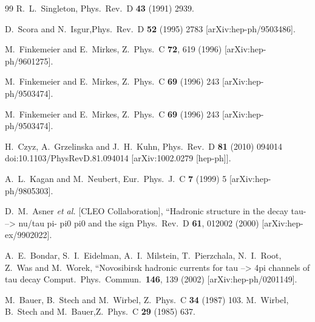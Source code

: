 \documentclass{article}
\begin{document}
\begin{thebibliography}{99}
  R.~L.~Singleton,
  Phys.\ Rev.\  D {\bf 43} (1991) 2939.

 D.~Scora and N.~Isgur,Phys.\ Rev.\  D {\bf 52} (1995) 2783 [arXiv:hep-ph/9503486].

  M.~Finkemeier and E.~Mirkes,
  Z.\ Phys.\  C {\bf 72}, 619 (1996)
  [arXiv:hep-ph/9601275].

M.~Finkemeier and E.~Mirkes,
Z.\ Phys.\  C {\bf 69} (1996) 243 [arXiv:hep-ph/9503474].

M.~Finkemeier and E.~Mirkes,
Z.\ Phys.\  C {\bf 69} (1996) 243 [arXiv:hep-ph/9503474].

H.~Czyz, A.~Grzelinska and J.~H.~Kuhn,
Phys.\ Rev.\ D {\bf 81} (2010) 094014
doi:10.1103/PhysRevD.81.094014
[arXiv:1002.0279 [hep-ph]].

 A.~L.~Kagan and M.~Neubert,
Eur.\ Phys.\ J.\  C {\bf 7} (1999) 5 [arXiv:hep-ph/9805303].

  D.~M.~Asner {\it et al.}  [CLEO Collaboration],
   ``Hadronic structure in the decay tau- --> nu/tau pi- pi0 pi0 and the  sign
  Phys.\ Rev.\  D {\bf 61}, 012002 (2000)
  [arXiv:hep-ex/9902022].

  A.~E.~Bondar, S.~I.~Eidelman, A.~I.~Milstein, T.~Pierzchala, N.~I.~Root, Z.~Was and M.~Worek,
   ``Novosibirsk hadronic currents for tau --> 4pi channels of tau decay
  Comput.\ Phys.\ Commun.\  {\bf 146}, 139 (2002)
  [arXiv:hep-ph/0201149].

 M.~Bauer, B.~Stech and M.~Wirbel,
Z.\ Phys.\  C {\bf 34} (1987) 103.
 M.~Wirbel, B.~Stech and M.~Bauer,Z.\ Phys.\  C {\bf 29} (1985) 637.


\end{thebibliography}
\end{document}
